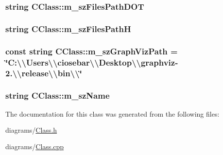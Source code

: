 \hypertarget{class_c_class_a4cf97b0cde501346ac139deaeab2573a}{
\subsubsection[{m\+\_\+sz\+Files\+Path\+D\+O\+T}]{\setlength{\rightskip}{0pt plus 5cm}string C\+Class\+::m\+\_\+sz\+Files\+Path\+D\+O\+T}}\label{class_c_class_a4cf97b0cde501346ac139deaeab2573a}
\hypertarget{class_c_class_a590754a9bdd5a6fc0104378da2fb7891}{
\subsubsection[{m\+\_\+sz\+Files\+Path\+H}]{\setlength{\rightskip}{0pt plus 5cm}string C\+Class\+::m\+\_\+sz\+Files\+Path\+H}}\label{class_c_class_a590754a9bdd5a6fc0104378da2fb7891}
\hypertarget{class_c_class_a8ee7eb6ac6ebd9f4b31324f9daeb07c2}{
\subsubsection[{m\+\_\+sz\+Graph\+Viz\+Path}]{\setlength{\rightskip}{0pt plus 5cm}const string C\+Class\+::m\+\_\+sz\+Graph\+Viz\+Path = \char`\"{}C\+:\textbackslash{}\textbackslash{}\+Users\textbackslash{}\textbackslash{}ciosebar\textbackslash{}\textbackslash{}\+Desktop\textbackslash{}\textbackslash{}graphviz-\/2.\textbackslash{}\textbackslash{}release\textbackslash{}\textbackslash{}bin\textbackslash{}\textbackslash{}\char`\"{}}}\label{class_c_class_a8ee7eb6ac6ebd9f4b31324f9daeb07c2}
\hypertarget{class_c_class_ae7f5bac3dd30935df8d31dacacfea3e2}{
\subsubsection[{m\+\_\+sz\+Name}]{\setlength{\rightskip}{0pt plus 5cm}string C\+Class\+::m\+\_\+sz\+Name}}\label{class_c_class_ae7f5bac3dd30935df8d31dacacfea3e2}


The documentation for this class was generated from the following files\+:\begin{DoxyCompactItemize}
\item 
diagrams/\hyperlink{_class_8h}{Class.\+h}\item 
diagrams/\hyperlink{_class_8cpp}{Class.\+cpp}\end{DoxyCompactItemize}
